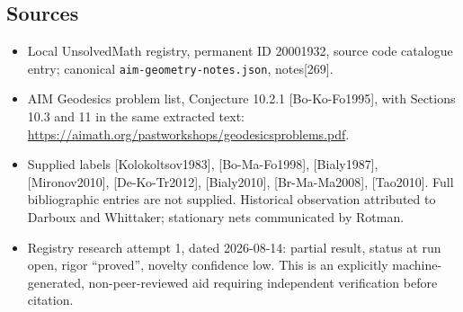 \documentclass[11pt]{article}
\begin{document}
\subsection{Sources}
\begin{itemize}
\item Local UnsolvedMath registry, permanent ID 20001932, source code catalogue entry; canonical \texttt{aim-geometry-notes.json}, notes[269].
\item AIM Geodesics problem list, Conjecture 10.2.1 [Bo-Ko-Fo1995], with Sections 10.3 and 11 in the same extracted text: \url{https://aimath.org/pastworkshops/geodesicsproblems.pdf}.
\item Supplied labels [Kolokoltsov1983], [Bo-Ma-Fo1998], [Bialy1987], [Mironov2010], [De-Ko-Tr2012], [Bialy2010], [Br-Ma-Ma2008], [Tao2010]. Full bibliographic entries are not supplied. Historical observation attributed to Darboux and Whittaker; stationary nets communicated by Rotman.
\item Registry research attempt 1, dated 2026-08-14: partial result, status at run open, rigor ``proved'', novelty confidence low. This is an explicitly machine-generated, non-peer-reviewed aid requiring independent verification before citation.
\end{itemize}
\end{document}
